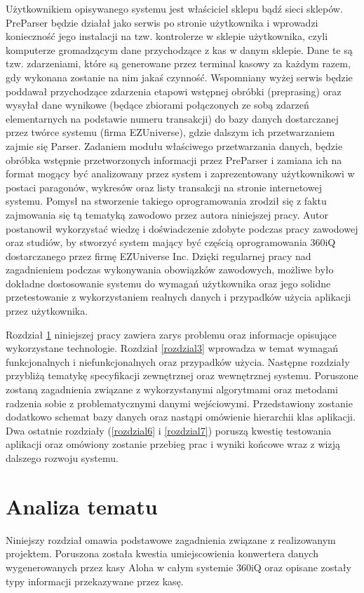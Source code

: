 \documentclass[a4paper]{book}
\begin{document}
Użytkownikiem opisywanego systemu jest właściciel sklepu bądź sieci sklepów. PreParser będzie działał jako serwis po stronie użytkownika i wprowadzi konieczność jego instalacji na tzw. kontrolerze w sklepie użytkownika, czyli komputerze gromadzącym dane przychodzące z kas w danym sklepie. Dane te są tzw. zdarzeniami, które są generowane przez terminal kasowy za każdym razem, gdy wykonana zostanie na nim jakaś czynność. Wspomniany wyżej serwis będzie poddawał przychodzące zdarzenia etapowi wstępnej obróbki (preprasing) oraz wysyłał dane wynikowe (będące zbiorami połączonych ze sobą zdarzeń elementarnych na podstawie numeru transakcji) do bazy danych dostarczanej przez twórce systemu (firma EZUniverse), gdzie dalszym ich przetwarzaniem zajmie się Parser. Zadaniem modułu właściwego przetwarzania danych, będzie obróbka wstępnie przetworzonych informacji przez PreParser i zamiana ich na format mogący być analizowany przez system i zaprezentowany użytkownikowi w postaci paragonów, wykresów oraz listy transakcji na stronie internetowej systemu. Pomysł na stworzenie takiego oprogramowania zrodził się z faktu zajmowania się tą tematyką zawodowo przez autora niniejszej pracy. Autor postanowił wykorzystać wiedzę i doświadczenie zdobyte podczas pracy zawodowej oraz studiów, by stworzyć system mający być częścią oprogramowania 360iQ dostarczanego przez firmę EZUniverse Inc. Dzięki regularnej pracy nad zagadnieniem podczas wykonywania obowiązków zawodowych, możliwe było dokładne dostosowanie systemu do wymagań użytkownika oraz jego solidne przetestowanie z wykorzystaniem realnych danych i przypadków użycia aplikacji przez użytkownika.

Rozdział \ref{rozdzial2} niniejszej pracy zawiera zarys problemu oraz informacje opisujące wykorzystane technologie. Rozdział \ref{rozdzial3} wprowadza w temat wymagań funkcjonalnych i niefunkcjonalnych oraz przypadków użycia. Następne rozdziały przybliżą tematykę specyfikacji zewnętrznej oraz wewnętrznej systemu. Poruszone zostaną zagadnienia związane z wykorzystanymi algorytmami oraz metodami radzenia sobie z problematycznymi danymi wejściowymi. Przedstawiony zostanie dodatkowo schemat bazy danych oraz nastąpi omówienie hierarchii klas aplikacji. Dwa ostatnie rozdziały (\ref{rozdzial6} i \ref{rozdzial7}) poruszą kwestię testowania aplikacji oraz omówiony zostanie przebieg prac i wyniki końcowe wraz z wizją dalszego rozwoju systemu. 
\chapter{Analiza tematu}
\label{rozdzial2}
Niniejszy rozdział omawia podstawowe zagadnienia związane z realizowanym projektem. Poruszona została kwestia umiejscowienia konwertera danych wygenerowanych przez kasy Aloha w całym systemie 360iQ oraz opisane zostały typy informacji przekazywane przez kasę.
\end{document}
